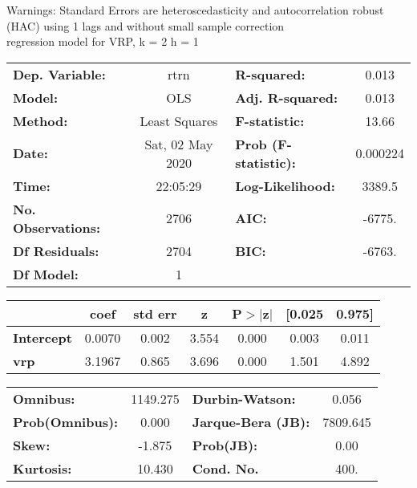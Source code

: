 Warnings: \newline
 [1] Standard Errors are heteroscedasticity and autocorrelation robust (HAC) using 1 lags and without small sample correction\\ 

regression model for VRP, k = 2 h = 1\begin{center}
\begin{tabular}{lclc}
\toprule
\textbf{Dep. Variable:}    &       rtrn       & \textbf{  R-squared:         } &     0.013   \\
\textbf{Model:}            &       OLS        & \textbf{  Adj. R-squared:    } &     0.013   \\
\textbf{Method:}           &  Least Squares   & \textbf{  F-statistic:       } &     13.66   \\
\textbf{Date:}             & Sat, 02 May 2020 & \textbf{  Prob (F-statistic):} &  0.000224   \\
\textbf{Time:}             &     22:05:29     & \textbf{  Log-Likelihood:    } &    3389.5   \\
\textbf{No. Observations:} &        2706      & \textbf{  AIC:               } &    -6775.   \\
\textbf{Df Residuals:}     &        2704      & \textbf{  BIC:               } &    -6763.   \\
\textbf{Df Model:}         &           1      & \textbf{                     } &             \\
\bottomrule
\end{tabular}
\begin{tabular}{lcccccc}
                   & \textbf{coef} & \textbf{std err} & \textbf{z} & \textbf{P$> |$z$|$} & \textbf{[0.025} & \textbf{0.975]}  \\
\midrule
\textbf{Intercept} &       0.0070  &        0.002     &     3.554  &         0.000        &        0.003    &        0.011     \\
\textbf{vrp}       &       3.1967  &        0.865     &     3.696  &         0.000        &        1.501    &        4.892     \\
\bottomrule
\end{tabular}
\begin{tabular}{lclc}
\textbf{Omnibus:}       & 1149.275 & \textbf{  Durbin-Watson:     } &    0.056  \\
\textbf{Prob(Omnibus):} &   0.000  & \textbf{  Jarque-Bera (JB):  } & 7809.645  \\
\textbf{Skew:}          &  -1.875  & \textbf{  Prob(JB):          } &     0.00  \\
\textbf{Kurtosis:}      &  10.430  & \textbf{  Cond. No.          } &     400.  \\
\bottomrule
\end{tabular}
\end{center}

